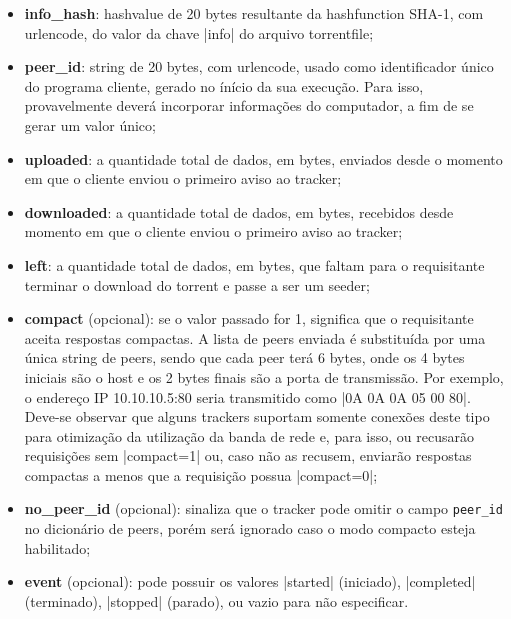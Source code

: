 \begin{itemize}
    \item \textbf{info\_hash}: \gls*{hashvalue} de 20 bytes resultante da
    \gls*{hashfunction} SHA-1, com \gls*{urlencode}, do valor da chave \bverb|info| do
    arquivo \gls*{torrentfile};

    \item \textbf{peer\_id}: \gls*{string} de 20 bytes, com \gls*{urlencode}, usado como
    identificador único do programa cliente, gerado no ínício da sua execução. Para
    isso, provavelmente deverá incorporar informações do computador, a fim de se gerar
    um valor único;

    \item \textbf{uploaded}: a quantidade total de dados, em bytes, enviados desde o
    momento em que o cliente enviou o primeiro aviso ao \gls*{tracker};

    \item \textbf{downloaded}: a quantidade total de dados, em bytes, recebidos desde
    momento em que o cliente enviou o primeiro aviso ao \gls*{tracker};

    \item \textbf{left}: a quantidade total de dados, em bytes, que faltam para o
    requisitante terminar o download do \gls*{torrent} e passe a ser um \gls*{seeder};

    \item \textbf{compact} (opcional): se o valor passado for 1, significa que o
    requisitante aceita respostas compactas. A lista de \glspl*{peer} enviada é
    substituída por uma única \gls*{string} de peers, sendo que cada \gls*{peer} terá
    6 bytes, onde os 4 bytes iniciais são o host e os 2 bytes finais são a porta de
    transmissão. Por exemplo, o endereço IP 10.10.10.5:80 seria transmitido como
    \bverb|0A 0A 0A 05 00 80|. Deve-se observar que alguns \glspl*{tracker} suportam
    somente conexões deste tipo para otimização da utilização da banda de rede e, para
    isso, ou recusarão requisições sem \bverb|compact=1| ou, caso não as recusem,
    enviarão respostas compactas a menos que a requisição possua \bverb|compact=0|;

    \item \textbf{no\_peer\_id} (opcional): sinaliza que o \gls*{tracker} pode omitir o
    campo \textcolor{Bittersweet}{\texttt{peer\_id}} no dicionário de \glspl*{peer},
    porém será ignorado caso o modo compacto esteja habilitado;

    \item \textbf{event} (opcional): pode possuir os valores \sverb|started|
    (iniciado), \sverb|completed| (terminado), \sverb|stopped| (parado), ou vazio para
    não especificar.


\end{itemize}
